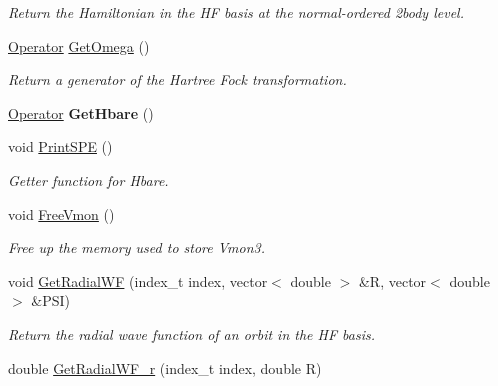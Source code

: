 \begin{DoxyCompactItemize}
\begin{DoxyCompactList}\small\item\em Return the Hamiltonian in the HF basis at the normal-\/ordered 2body level. \end{DoxyCompactList}\item 
\hyperlink{classOperator}{Operator} \hyperlink{classHartreeFock_a53011b381945ed5c61f50b209db5bf64}{Get\+Omega} ()
\begin{DoxyCompactList}\small\item\em Return a generator of the Hartree Fock transformation. \end{DoxyCompactList}\item 
\hyperlink{classOperator}{Operator} {\bfseries Get\+Hbare} ()\hypertarget{classHartreeFock_a7f2a07edc3ccaa0cf9bbc0faadfd9ddf}{}\label{classHartreeFock_a7f2a07edc3ccaa0cf9bbc0faadfd9ddf}

\item 
void \hyperlink{classHartreeFock_ab96b85eca26bf7c57430242201066932}{Print\+S\+PE} ()
\begin{DoxyCompactList}\small\item\em Getter function for Hbare. \end{DoxyCompactList}\item 
void \hyperlink{classHartreeFock_aef3c1b45c5418ead19f258774a301f83}{Free\+Vmon} ()\hypertarget{classHartreeFock_aef3c1b45c5418ead19f258774a301f83}{}\label{classHartreeFock_aef3c1b45c5418ead19f258774a301f83}

\begin{DoxyCompactList}\small\item\em Free up the memory used to store Vmon3. \end{DoxyCompactList}\item 
void \hyperlink{classHartreeFock_a2bc07257af2fe0ca86e6a3f8c642c3c6}{Get\+Radial\+WF} (index\+\_\+t index, vector$<$ double $>$ \&R, vector$<$ double $>$ \&P\+SI)\hypertarget{classHartreeFock_a2bc07257af2fe0ca86e6a3f8c642c3c6}{}\label{classHartreeFock_a2bc07257af2fe0ca86e6a3f8c642c3c6}

\begin{DoxyCompactList}\small\item\em Return the radial wave function of an orbit in the HF basis. \end{DoxyCompactList}\item 
double \hyperlink{classHartreeFock_a29de897a332985f5b08bd0f08a466db3}{Get\+Radial\+W\+F\+\_\+r} (index\+\_\+t index, double R)\hypertarget{classHartreeFock_a29de897a332985f5b08bd0f08a466db3}{}\label{classHartreeFock_a29de897a332985f5b08bd0f08a466db3}


\end{DoxyCompactItemize}
